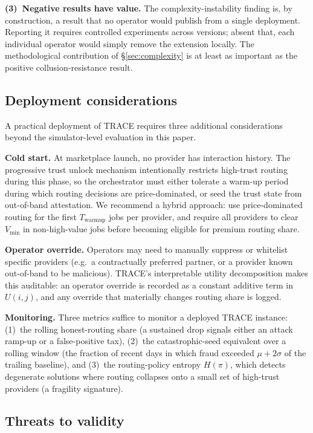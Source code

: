 \documentclass[sigconf,nonacm,10pt]{acmart}
\begin{document}
\noindent\textbf{(3)~Negative results have value.}
The complexity-instability finding is, by construction, a result
that no operator would publish from a single deployment. Reporting
it requires controlled experiments across versions; absent that,
each individual operator would simply remove the extension
locally. The methodological contribution of
\S\ref{sec:complexity} is at least as important as the
positive collusion-resistance result.

\subsection{Deployment considerations}

A practical deployment of TRACE requires three additional
considerations beyond the simulator-level evaluation in this
paper.

\noindent\textbf{Cold start.}
At marketplace launch, no provider has interaction history. The
progressive trust unlock mechanism intentionally restricts
high-trust routing during this phase, so the orchestrator must
either tolerate a warm-up period during which routing decisions
are price-dominated, or seed the trust state from out-of-band
attestation. We recommend a hybrid approach: use price-dominated
routing for the first $T_{\text{warmup}}$ jobs per provider, and
require all providers to clear $V_{\min}$ in
non-high-value jobs before becoming eligible for premium routing
share.

\noindent\textbf{Operator override.}
Operators may need to manually suppress or whitelist specific
providers (e.g.\ a contractually preferred partner, or a provider
known out-of-band to be malicious). TRACE's interpretable
utility decomposition makes this auditable: an operator override
is recorded as a constant additive term in $U(i, j)$, and any
override that materially changes routing share is logged.

\noindent\textbf{Monitoring.}
Three metrics suffice to monitor a deployed TRACE
instance:
(1)~the rolling honest-routing share (a sustained drop signals
either an attack ramp-up or a false-positive tax),
(2)~the catastrophic-seed equivalent over a rolling window (the
fraction of recent days in which fraud exceeded
$\mu + 2\sigma$ of the trailing baseline), and
(3)~the routing-policy entropy $H(\pi)$, which detects degenerate
solutions where routing collapses onto a small set of
high-trust providers (a fragility signature).

\subsection{Threats to validity}
\end{document}
